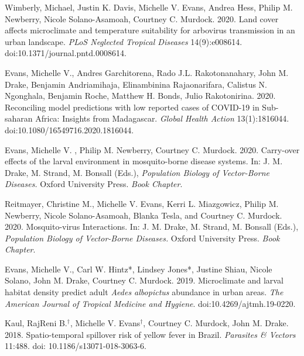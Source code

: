 \begin{etaremune}
\item Wimberly, Michael, Justin K. Davis, \textcolor{awesome}{Michelle V. Evans}, Andrea Hess, Philip M. Newberry, Nicole Solano-Asamoah, Courtney C. Murdock. 2020. Land cover affects microclimate and temperature suitability for arbovirus transmission in an urban landscape. \textit{PLoS Neglected Tropical Diseases} 14(9):e008614. doi:10.1371/journal.pntd.0008614. \smallskip

\item \textcolor{awesome}{Evans, Michelle V.}, Andres Garchitorena, Rado J.L. Rakotonanahary, John M. Drake, Benjamin Andriamihaja, Elinambinina Rajaonarifara, Calistus N. Ngonghala, Benjamin Roche, Matthew H. Bonds, Julio Rakotonirina. 2020. Reconciling model predictions with low reported cases of COVID-19 in Sub-saharan Africa: Insights from Madagascar. \textit{Global Health Action} 13(1):1816044. \\doi:10.1080/16549716.2020.1816044. \smallskip

\item \textcolor{awesome}{Evans, Michelle V. }, Philip M. Newberry, Courtney C. Murdock. 2020. Carry-over effects of the larval environment in mosquito-borne disease systems. In: J. M. Drake, M. Strand, M. Bonsall (Eds.), \textit{Population Biology of Vector-Borne Diseases.} Oxford University Press. \textit{Book Chapter}.\smallskip

\item Reitmayer, Christine M., \textcolor{awesome}{Michelle V. Evans}, Kerri L. Miazgowicz, Philip M. Newberry, Nicole Solano-Asamoah, Blanka Tesla, and Courtney C. Murdock. 2020. Mosquito-virus Interactions. In: J. M. Drake, M. Strand, M. Bonsall (Eds.), \textit{Population Biology of Vector-Borne Diseases.} Oxford University Press. \textit{Book Chapter}. \smallskip

\item \textcolor{awesome}{Evans, Michelle V.}, Carl W. Hintz*, Lindsey Jones*, Justine Shiau, Nicole Solano, John M. Drake, Courtney C. Murdock. 2019. Microclimate and larval habitat density predict adult \textit{Aedes albopictus} abundance in urban areas. \textit{The American Journal of Tropical Medicine and Hygiene}. doi:10.4269/ajtmh.19-0220. \smallskip

\item Kaul, RajReni B.$^\dagger$, \textcolor{awesome}{Michelle V. Evans}$^\dagger$, Courtney C. Murdock, John M. Drake. 2018. Spatio-temporal spillover risk of yellow fever in Brazil. \textit{Parasites \& Vectors} 11:488. doi: 10.1186/s13071-018-3063-6.
\smallskip


\end{etaremune}
